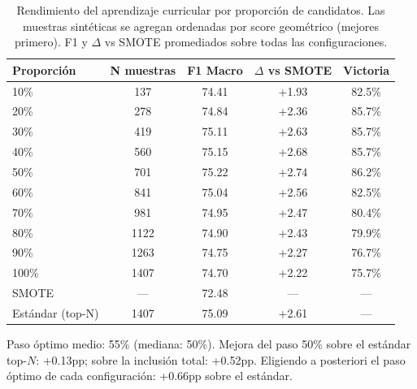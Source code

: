\begin{table}[htbp]
\centering
\small
\caption{Rendimiento del aprendizaje curricular por proporción de candidatos. Las muestras sintéticas se agregan ordenadas por score geométrico (mejores primero). F1 y $\Delta$ vs SMOTE promediados sobre todas las configuraciones.}
\label{tab:curriculum_results}
\begin{tabular}{lcccc}
\toprule
\textbf{Proporción} & \textbf{N muestras} & \textbf{F1 Macro} & \textbf{$\Delta$ vs SMOTE} & \textbf{Victoria} \\
\midrule
10\% & 137 & 74.41 & +1.93 & 82.5\% \\
20\% & 278 & 74.84 & +2.36 & 85.7\% \\
30\% & 419 & 75.11 & +2.63 & 85.7\% \\
40\% & 560 & 75.15 & +2.68 & 85.7\% \\
50\% & 701 & 75.22 & +2.74 & 86.2\% \\
60\% & 841 & 75.04 & +2.56 & 82.5\% \\
70\% & 981 & 74.95 & +2.47 & 80.4\% \\
80\% & 1122 & 74.90 & +2.43 & 79.9\% \\
90\% & 1263 & 74.75 & +2.27 & 76.7\% \\
100\% & 1407 & 74.70 & +2.22 & 75.7\% \\
\midrule
SMOTE & --- & 72.48 & --- & --- \\
Estándar (top-N) & 1407 & 75.09 & +2.61 & --- \\
\bottomrule
\end{tabular}
\par\smallskip
{\small Paso óptimo medio: 55\% (mediana: 50\%). Mejora del paso 50\% sobre el estándar top-$N$: +0.13pp; sobre la inclusión total: +0.52pp. Eligiendo a posteriori el paso óptimo de cada configuración: +0.66pp sobre el estándar.}
\end{table}

